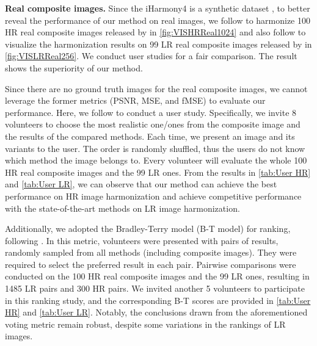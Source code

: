 \documentclass[10pt,journal,twocolumn,twoside]{IEEEtran}
\begin{document}
\textbf{Real composite images.} Since the iHarmony4 is a synthetic dataset \cite{cong2020dovenet}, to better reveal the performance of our method on real images, we follow \cite{cong2022high} to harmonize 100 HR real composite images released by \cite{cong2022high} in \cref{fig:VISHRReal1024} and also follow \cite{guo2021intrinsic, hang2022scs, ling2021region} to visualize the harmonization results on 99 LR real composite images released by \cite{tsai2017deep} in \cref{fig:VISLRReal256}. We conduct user studies for a fair comparison. The result shows the superiority of our method.

Since there are no ground truth images for the real composite images, we cannot leverage the former metrics (PSNR, MSE, and fMSE) to evaluate our performance. Here, we follow \cite{ling2021region} to conduct a user study. Specifically, we invite 8 volunteers to choose the most realistic one/ones from the composite image and the results of the compared methods. Each time, we present an image and its variants to the user. The order is randomly shuffled, thus the users do not know which method the image belongs to. Every volunteer will evaluate the whole 100 HR real composite images and the 99 LR ones. From the results in \cref{tab:User HR} and \cref{tab:User LR}, we can observe that our method can achieve the best performance on HR image harmonization and achieve competitive performance with the state-of-the-art methods on LR image harmonization.

Additionally, we adopted the Bradley-Terry model (B-T model) \cite{bradley1952rank} for ranking, following \cite{cong2020dovenet, ke2022harmonizer}. In this metric, volunteers were presented with pairs of results, randomly sampled from all methods (including composite images). They were required to select the preferred result in each pair. Pairwise comparisons were conducted on the 100 HR real composite images and the 99 LR ones, resulting in 1485 LR pairs and 300 HR pairs. We invited another 5 volunteers to participate in this ranking study, and the corresponding B-T scores are provided in \cref{tab:User HR} and \cref{tab:User LR}. Notably, the conclusions drawn from the aforementioned voting metric remain robust, despite some variations in the rankings of LR images.
\end{document}

